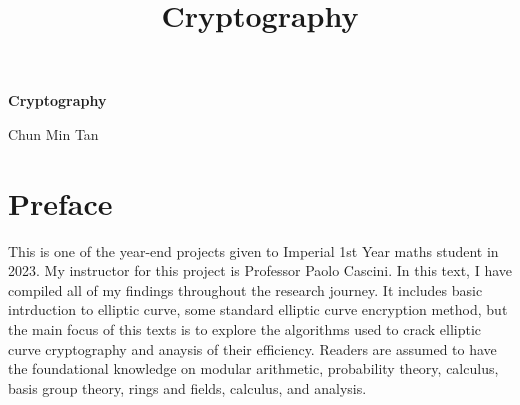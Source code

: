 \documentclass[a4 paper]{article}
\newcommand{\?}{\stackrel{?}{=}}
\begin{document}
\begin{titlepage}
\begin{center}
\vspace*{8cm}

\Huge

\textbf{Cryptography}

\vspace{1cm}

\huge


\vspace{0.8cm}
Chun Min Tan
\vspace{2cm}


\end{center}
\end{titlepage}


\newpage

\title{
\textbf{Cryptography}
}
\author{}
\date{}
\maketitle


\tableofcontents



\newpage
\section*{Preface}
This is one of the year-end projects given to Imperial 1st Year maths student in 2023. My instructor for this project is Professor Paolo Cascini. In this text, I have compiled all of my findings throughout the research journey. It includes basic intrduction to elliptic curve, some standard elliptic curve encryption method, but the main focus of this texts is to explore the algorithms used to crack elliptic curve cryptography and anaysis of their efficiency. Readers are assumed to have the foundational knowledge on modular arithmetic, probability theory, calculus, basis group theory, rings and fields, calculus, and analysis. 
\end{document}
